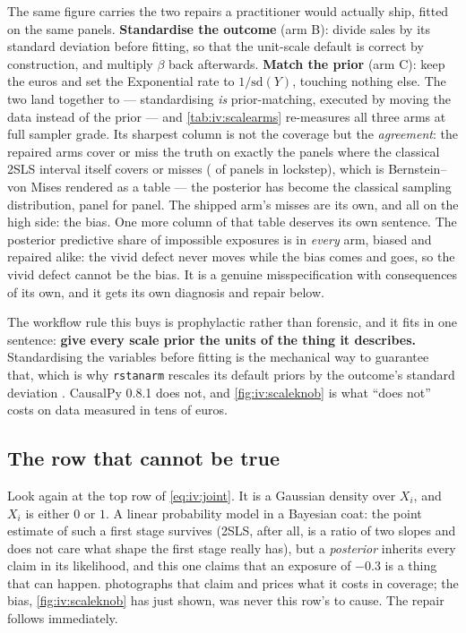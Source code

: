 

The same figure carries the two repairs a practitioner would actually ship, fitted on the same
panels. \textbf{Standardise the outcome} (arm B): divide sales by its standard deviation
before fitting, so that the unit-scale default is correct by construction, and multiply
$\beta$ back afterwards. \textbf{Match the prior} (arm C): keep the euros and set the
Exponential rate to $1/\mathrm{sd}(Y)$, touching nothing else. The two land together to
\eur{\nbElevenScaleBcGap} --- standardising \emph{is} prior-matching, executed by moving the
data instead of the prior --- and \cref{tab:iv:scalearms} re-measures all three arms at full
sampler grade. Its sharpest column is not the coverage but the \emph{agreement}: the repaired
arms cover or miss the truth on exactly the panels where the classical 2SLS interval itself
covers or misses (\nbElevenScaleFullStdAgree{} of \nbElevenNSeeds{} panels in lockstep), which
is Bernstein--von Mises rendered as a table --- the posterior has become the classical
sampling distribution, panel for panel. The shipped arm's misses are its own, and all on the
high side: the bias. One more column of that table deserves its own sentence. The posterior
predictive share of impossible exposures is \pc{\nbElevenScalePpcAllPct} in \emph{every} arm,
biased and repaired alike: the vivid defect never moves while the bias comes and goes, so the
vivid defect cannot be the bias. It is a genuine misspecification with consequences of its
own, and it gets its own diagnosis and repair below.



The workflow rule this buys is prophylactic rather than forensic, and it fits in one sentence:
\textbf{give every scale prior the units of the thing it describes.} Standardising the
variables before fitting is the mechanical way to guarantee that, which is why
\texttt{rstanarm} rescales its default priors by the outcome's standard deviation
\citep{goodrich2020rstanarm}. CausalPy 0.8.1 does not, and \cref{fig:iv:scaleknob} is what
``does not'' costs on data measured in tens of euros.

\subsection*{The row that cannot be true}

Look again at the top row of \cref{eq:iv:joint}. It is a Gaussian density over $X_i$, and $X_i$ is
either $0$ or $1$. A linear probability model in a Bayesian coat: the point estimate of such a first
stage survives (2SLS, after all, is a ratio of two slopes and does not care what shape the first
stage really has), but a \emph{posterior} inherits every claim in its likelihood, and this one claims
that an exposure of $-0.3$ is a thing that can happen.  photographs that claim
and prices what it costs in coverage; the bias, \cref{fig:iv:scaleknob} has just shown, was never
this row's to cause. The repair follows immediately.

